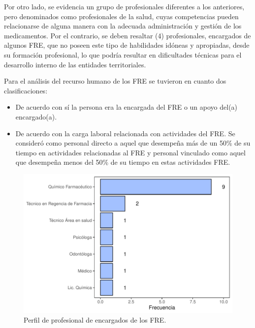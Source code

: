 \documentclass[
]{book}
\begin{document}
Por otro lado, se evidencia un grupo de profesionales diferentes a los anteriores, pero denominados como profesionales de la salud, cuyas competencias pueden relacionarse de alguna manera con la adecuada administración y gestión de los medicamentos. Por el contrario, se deben resaltar (4) profesionales, encargados de algunos FRE, que no poseen este tipo de habilidades idóneas y apropiadas, desde su formación profesional, lo que podría resultar en dificultades técnicas para el desarrollo interno de las entidades territoriales.

Para el análisis del recurso humano de los FRE se tuvieron en cuanto dos clasificaciones:

\begin{itemize}
\item
  De acuerdo con sí la persona era la encargada del FRE o un apoyo del(a) encargado(a).
\item
  De acuerdo con la carga laboral relacionada con actividades del FRE. Se consideró como personal directo a aquel que desempeña más de un 50\% de su tiempo en actividades relacionadas al FRE y personal vinculado como aquel que desempeña menos del 50\% de su tiempo en estas actividades FRE.
\end{itemize}

\begin{figure}[t!]

{\centering \includegraphics[width=1\linewidth]{InformeFinal_files/figure-latex/perfilProfesionalEncargado-1} 

}

\caption{Perfil de profesional de encargados de los FRE.}\label{fig:perfilProfesionalEncargado}
\end{figure}
\end{document}

